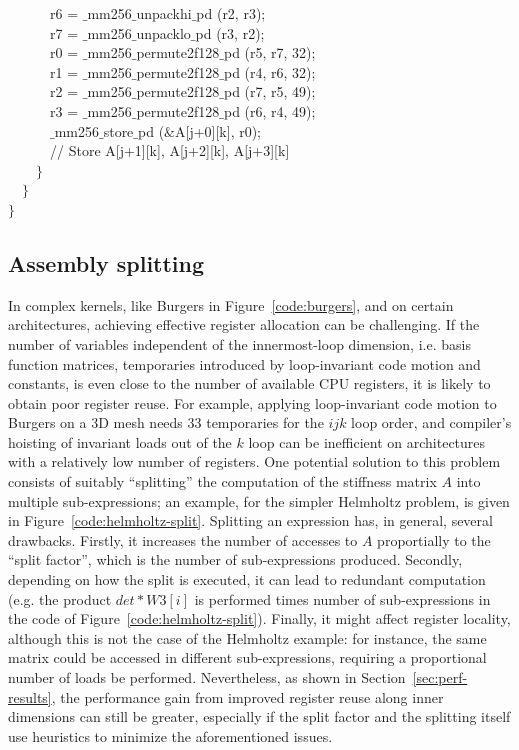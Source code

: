 \documentclass[conference]{IEEEtran}
\begin{document}
\begin{algorithm}[t]
~~~~~~r6 = $\_$mm256$\_$unpackhi$\_$pd (r2, r3);\\
~~~~~~r7 = $\_$mm256$\_$unpacklo$\_$pd (r3, r2);\\
~~~~~~r0 = $\_$mm256$\_$permute2f128$\_$pd (r5, r7, 32);\\
~~~~~~r1 = $\_$mm256$\_$permute2f128$\_$pd (r4, r6, 32);\\
~~~~~~r2 = $\_$mm256$\_$permute2f128$\_$pd (r7, r5, 49);\\
~~~~~~r3 = $\_$mm256$\_$permute2f128$\_$pd (r6, r4, 49);\\
~~~~~~$\_$mm256$\_$store$\_$pd ($\&$A[j+0][k], r0);\\
~~~~~~// Store A[j+1][k], A[j+2][k], A[j+3][k]\\
~~~~$\rbrace$\\
~~$\rbrace$\\
$\rbrace$
\end{algorithm}


\subsection{Assembly splitting}
In complex kernels, like Burgers in Figure~\ref{code:burgers}, and on certain architectures, achieving effective register allocation can be challenging. If the number of variables independent of the innermost-loop dimension, i.e. basis function matrices, temporaries introduced by loop-invariant code motion and constants, is even close to the number of available CPU registers, it is likely to obtain poor register reuse. For example, applying loop-invariant code motion to Burgers on a 3D mesh needs 33 temporaries for the $ijk$ loop order, and compiler's hoisting of invariant loads out of the $k$ loop can be inefficient on architectures with a relatively low number of registers. One potential solution to this problem consists of suitably ``splitting'' the computation of the stiffness matrix $A$ into multiple sub-expressions; an example, for the simpler Helmholtz problem, is given in Figure~\ref{code:helmholtz-split}. Splitting an expression has, in general, several drawbacks. Firstly, it increases the number of accesses to $A$ proportially to the ``split factor'', which is the number of sub-expressions produced. Secondly, depending on how the split is executed, it can lead to redundant computation (e.g. the product $det*W3[i]$ is performed times number of sub-expressions in the code of Figure~\ref{code:helmholtz-split}). Finally, it might affect register locality, although this is not the case of the Helmholtz example: for instance, the same matrix could be accessed in different sub-expressions, requiring a proportional number of loads be performed. Nevertheless, as shown in Section~\ref{sec:perf-results}, the performance gain from improved register reuse along inner dimensions can still be greater, especially if the split factor and the splitting itself use heuristics to minimize the aforementioned issues.
\end{document}
